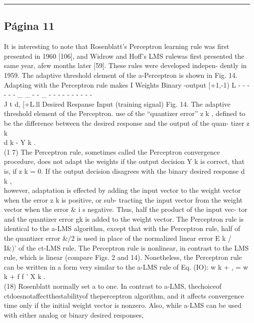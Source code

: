 \begin{center}\rule{0.5\linewidth}{0.5pt}\end{center}

\subsection{Página 11}\label{puxe1gina-11}

It is interesting to note that Rosenblatt's Perceptron learning rule was
first presented in 1960 {[}106{]}, and Widrow and Hoff's LMS rulewas
first presented the same year, afew months later {[}59{]}. These rules
were developed indepen- dently in 1959. The adaptive threshold element
of the a-Perceptron is shown in Fig. 14. Adapting with the Perceptron
rule makes I Weights Binary -output {[}+1,-1) L - - - - - - \_ \_ - - \_
- - - - - - - - - -\\
J t d, {[}+L.ll Desired Respanse Input (training signal) Fig. 14. The
adaptive threshold element of the Perceptron. use of the ``quantizer
error'' z k , defined to be the difference between the desired response
and the output of the quan- tizer z k\\
d k - Y k .\\
(1 7) The Perceptron rule, sometimes called the Perceptron convergence
procedure, does not adapt the weights if the output decision Y k is
correct, that is, if z k = 0. If the output decision disagrees with the
binary desired response d k ,\\
however, adaptation is effected by adding the input vector to the weight
vector when the error z k is positive, or sub- tracting the input vector
from the weight vector when the error \& i s negative. Thus, half the
product of the input vec- tor and the quantizer error gk is added to the
weight vector. The Perceptron rule is identical to the a-LMS algorithm,
except that with the Perceptron rule, half of the quantizer error \&/2
is used in place of the normalized linear error E k /\\
I\&)' of the ct-LMS rule. The Perceptron rule is nonlinear, in contrast
to the LMS rule, which is linear (compare Figs. 2 and 14). Nonetheless,
the Perceptron rule can be written in a form very similar to the a-LMS
rule of Eq. (IO): w k + , = w k + f f ' X k .\\
(18) Rosenblatt normally set a to one. In contrast to a-LMS, thechoiceof
ctdoesnotaffectthestabilityof theperceptron algorithm, and it affects
convergence time only if the initial weight vector is nonzero. Also,
while a-LMS can be used with either analog or binary desired responses,
